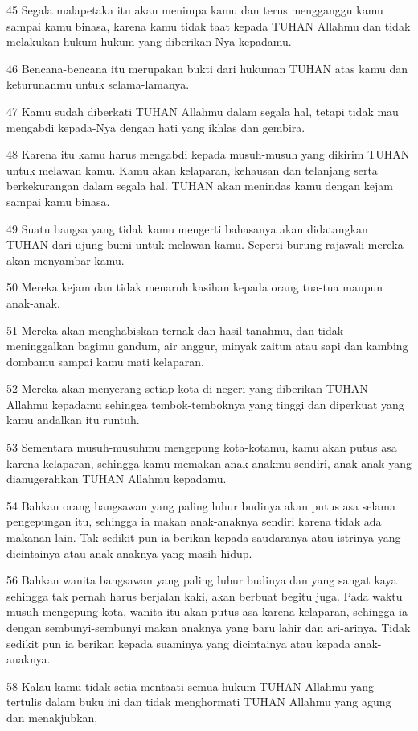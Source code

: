 \par 45 Segala malapetaka itu akan menimpa kamu dan terus mengganggu kamu sampai kamu binasa, karena kamu tidak taat kepada TUHAN Allahmu dan tidak melakukan hukum-hukum yang diberikan-Nya kepadamu.
\par 46 Bencana-bencana itu merupakan bukti dari hukuman TUHAN atas kamu dan keturunanmu untuk selama-lamanya.
\par 47 Kamu sudah diberkati TUHAN Allahmu dalam segala hal, tetapi tidak mau mengabdi kepada-Nya dengan hati yang ikhlas dan gembira.
\par 48 Karena itu kamu harus mengabdi kepada musuh-musuh yang dikirim TUHAN untuk melawan kamu. Kamu akan kelaparan, kehausan dan telanjang serta berkekurangan dalam segala hal. TUHAN akan menindas kamu dengan kejam sampai kamu binasa.
\par 49 Suatu bangsa yang tidak kamu mengerti bahasanya akan didatangkan TUHAN dari ujung bumi untuk melawan kamu. Seperti burung rajawali mereka akan menyambar kamu.
\par 50 Mereka kejam dan tidak menaruh kasihan kepada orang tua-tua maupun anak-anak.
\par 51 Mereka akan menghabiskan ternak dan hasil tanahmu, dan tidak meninggalkan bagimu gandum, air anggur, minyak zaitun atau sapi dan kambing dombamu sampai kamu mati kelaparan.
\par 52 Mereka akan menyerang setiap kota di negeri yang diberikan TUHAN Allahmu kepadamu sehingga tembok-temboknya yang tinggi dan diperkuat yang kamu andalkan itu runtuh.
\par 53 Sementara musuh-musuhmu mengepung kota-kotamu, kamu akan putus asa karena kelaparan, sehingga kamu memakan anak-anakmu sendiri, anak-anak yang dianugerahkan TUHAN Allahmu kepadamu.
\par 54 Bahkan orang bangsawan yang paling luhur budinya akan putus asa selama pengepungan itu, sehingga ia makan anak-anaknya sendiri karena tidak ada makanan lain. Tak sedikit pun ia berikan kepada saudaranya atau istrinya yang dicintainya atau anak-anaknya yang masih hidup.
\par 56 Bahkan wanita bangsawan yang paling luhur budinya dan yang sangat kaya sehingga tak pernah harus berjalan kaki, akan berbuat begitu juga. Pada waktu musuh mengepung kota, wanita itu akan putus asa karena kelaparan, sehingga ia dengan sembunyi-sembunyi makan anaknya yang baru lahir dan ari-arinya. Tidak sedikit pun ia berikan kepada suaminya yang dicintainya atau kepada anak-anaknya.
\par 58 Kalau kamu tidak setia mentaati semua hukum TUHAN Allahmu yang tertulis dalam buku ini dan tidak menghormati TUHAN Allahmu yang agung dan menakjubkan,
